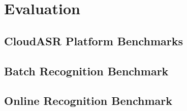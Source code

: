 \chapter{Evaluation}\label{chapter:evaluation}
\blindtext

\section{CloudASR Platform Benchmarks}
\blindtext
\blindtext


\section{Batch Recognition Benchmark}
\blindtext
{}
\blindtext


\section{Online Recognition Benchmark}
\blindtext
{}
\blindtext

